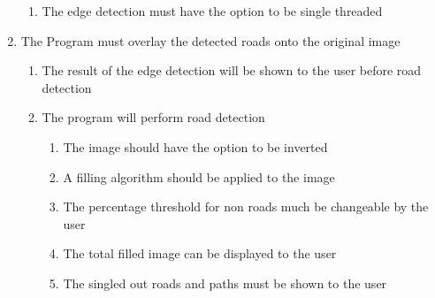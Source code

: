 \begin{FlushLeft}
\begin{enumerate}
\begin{enumerate}
                \item The edge detection must have the option to be single threaded
            \end{enumerate}
            
            \item The Program must overlay the detected roads onto the original image
            \begin{enumerate}
                \item The result of the edge detection will be shown to the user before road detection
                \item The program will perform road detection
                \begin{enumerate}
                    \item The image should have the option to be inverted
                    \item A filling algorithm should be applied to the image
                    \item The percentage threshold for non roads much be changeable by the user
                    \item The total filled image can be displayed to the user
                    \item The singled out roads and paths must be shown to the user
                \end{enumerate}
                
            \end{enumerate}
            

\end{enumerate}
\end{FlushLeft}
